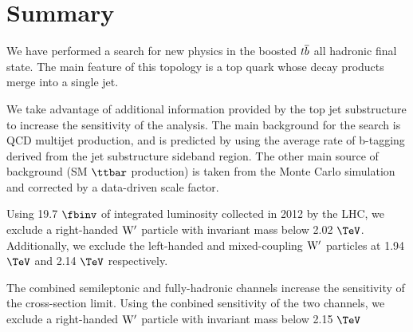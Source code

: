 \clearpage
\newpage
\chapter{Summary}
\label{sec:summary}
We have performed a search for new physics in the boosted ${t\overline{b}}$ all
hadronic final state.  The main feature of this topology is a top quark
whose decay products merge into a single jet. 

We take advantage of additional information provided by the top jet
substructure to increase the sensitivity of the analysis.  The main background for
the search is QCD multijet production, and is predicted by using the
average rate of b-tagging derived from the jet substructure sideband
region.  The other main source of background (SM $\ttbar$ production) is taken from 
the Monte Carlo simulation and corrected by a data-driven scale factor.

Using 19.7$~\fbinv$ of integrated luminosity collected in 2012 by the
LHC, we exclude a right-handed $\mathrm{W}^\prime$ particle with invariant mass
below 2.02 $\TeV$.  Additionally, we exclude the left-handed and mixed-coupling $\mathrm{W}^\prime$ particles at 1.94 $\TeV$ and 2.14 $\TeV$ respectively.

The combined semileptonic and fully-hadronic channels increase the sensitivity of the cross-section limit.  
Using the conbined sensitivity of the two channels, we exclude a right-handed $\mathrm{W}^\prime$ particle with invariant mass below 2.15$~\TeV$  

